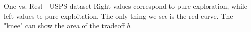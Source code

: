 \documentclass{beamer}
\begin{document}
\begin{frame}{One vs. Rest - USPS dataset}
Right values correspond to pure exploration, while left values to pure exploitation.
The only thing we see is the red curve. The "knee" can show the area of the tradeoff $b.$

\begin{figure}
\begin{centering}
\end{centering}
\end{figure}
\end{frame}

%
\end{document}
